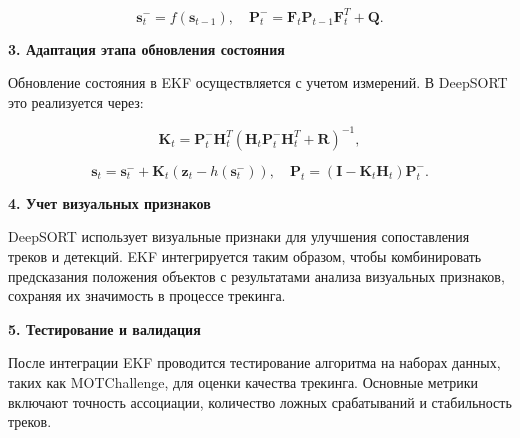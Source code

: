 \begin{equation}
\mathbf{s}_t^- = f(\mathbf{s}_{t-1}), \quad \mathbf{P}_t^- = \mathbf{F}_t \mathbf{P}_{t-1} \mathbf{F}_t^T + \mathbf{Q}.
\end{equation}

\textbf{3. Адаптация этапа обновления состояния}

Обновление состояния в EKF осуществляется с учетом измерений. В DeepSORT это реализуется через:

\begin{equation}
\mathbf{K}_t = \mathbf{P}_t^- \mathbf{H}_t^T (\mathbf{H}_t \mathbf{P}_t^- \mathbf{H}_t^T + \mathbf{R})^{-1},
\end{equation}

\begin{equation}
\mathbf{s}_t = \mathbf{s}_t^- + \mathbf{K}_t (\mathbf{z}_t - h(\mathbf{s}_t^-)), \quad \mathbf{P}_t = (\mathbf{I} - \mathbf{K}_t \mathbf{H}_t) \mathbf{P}_t^-.
\end{equation}

\textbf{4. Учет визуальных признаков}

DeepSORT использует визуальные признаки для улучшения сопоставления треков и детекций. EKF интегрируется таким образом, чтобы комбинировать предсказания положения объектов с результатами анализа визуальных признаков, сохраняя их значимость в процессе трекинга.

\textbf{5. Тестирование и валидация}

После интеграции EKF проводится тестирование алгоритма на наборах данных, таких как MOTChallenge, для оценки качества трекинга. Основные метрики включают точность ассоциации, количество ложных срабатываний и стабильность треков.

